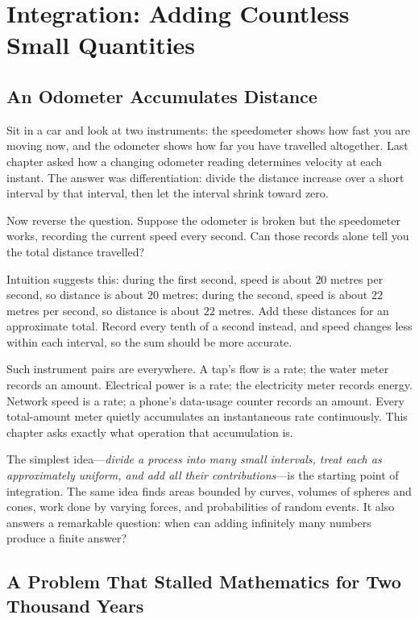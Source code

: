 \chapter{Integration: Adding Countless Small Quantities}

\section{An Odometer Accumulates Distance}

Sit in a car and look at two instruments: the speedometer shows how fast you are moving now, and the odometer shows how far you have travelled altogether. Last chapter asked how a changing odometer reading determines velocity at each instant. The answer was differentiation: divide the distance increase over a short interval by that interval, then let the interval shrink toward zero.

Now reverse the question. Suppose the odometer is broken but the speedometer works, recording the current speed every second. Can those records alone tell you the total distance travelled?

Intuition suggests this: during the first second, speed is about $20$ metres per second, so distance is about $20$ metres; during the second, speed is about $22$ metres per second, so distance is about $22$ metres. Add these distances for an approximate total. Record every tenth of a second instead, and speed changes less within each interval, so the sum should be more accurate.

Such instrument pairs are everywhere. A tap's flow is a rate; the water meter records an amount. Electrical power is a rate; the electricity meter records energy. Network speed is a rate; a phone's data-usage counter records an amount. Every total-amount meter quietly accumulates an instantaneous rate continuously. This chapter asks exactly what operation that accumulation is.

The simplest idea---\emph{divide a process into many small intervals, treat each as approximately uniform, and add all their contributions}---is the starting point of integration. The same idea finds areas bounded by curves, volumes of spheres and cones, work done by varying forces, and probabilities of random events. It also answers a remarkable question: when can adding infinitely many numbers produce a finite answer?

\section{A Problem That Stalled Mathematics for Two Thousand Years}

